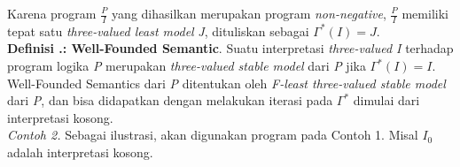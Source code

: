 Karena program $\frac{P}{I}$ yang dihasilkan merupakan program \textit{non-negative}, $\frac{P}{I}$ memiliki tepat satu \textit{three-valued least model} \textit{J}, dituliskan sebagai $\Gamma^*(I) = J$.
\\

\noindent \textbf{Definisi \thebabDuaNum.\thedefBabDua: Well-Founded Semantic}. Suatu interpretasi \textit{three-valued I} terhadap program logika \textit{P} merupakan \textit{three-valued stable model} dari \textit{P} jika $\Gamma^*(I) = I$. Well-Founded Semantics dari \textit{P} ditentukan oleh \textit{F-least three-valued stable model} dari \textit{P}, dan bisa didapatkan dengan melakukan iterasi pada $\Gamma^*$ dimulai dari interpretasi kosong.
\\

\noindent \textit{Contoh 2.} Sebagai ilustrasi, akan digunakan program pada Contoh 1. Misal $I_0$ adalah interpretasi kosong.

